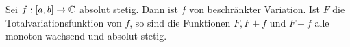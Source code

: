 Sei $f:[a,b]\to\mathbb{C}$ absolut stetig. \pause Dann ist $f$ von beschränkter Variation. \pause Ist $F$ die Totalvariationsfunktion von $f$, \pause so sind die Funktionen $F, F+f$ und $F-f$ \pause alle monoton wachsend \pause und absolut stetig.